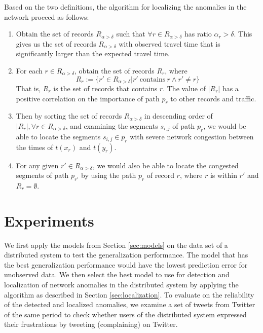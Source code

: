 \documentclass[conference]{IEEEtran.1.8}
\begin{document}
Based on the two definitions, the algorithm for localizing the anomalies in the network proceed as follows:
\begin{enumerate}
	\item Obtain the set of records $R_{\alpha > \delta}$ such that $\forall r \in R_{\alpha > \delta}$ has ratio $\alpha_r > \delta$. This gives us the set of records $R_{\alpha > \delta}$ with observed travel time that is significantly larger than the expected travel time.
	\item For each $r \in R_{\alpha > \delta}$, obtain the set of records $R_r$, where
	\[ R_{r} := \{ r' \in R_{\alpha > \delta} | r' ~ \text{contains} ~ r \land r' \neq r \} \]
	That is, $R_r$ is the set of records that contains $r$. The value of $|R_r|$ has a positive correlation on the importance of path $p_r$ to other records and traffic.
	\item Then by sorting the set of records $R_{\alpha > \delta}$ in descending order of $|R_r|, \forall r \in R_{\alpha > \delta}$, and examining the segments $s_{i,j}$ of path $p_r$, we would be able to locate the segments $s_{i,j} \in p_r$ with severe network congestion between the times of $t(x_r)$ and $t(y_r)$.
	\item For any given $r' \in R_{\alpha > \delta}$, we would also be able to locate the congested segments of path $p_{r'}$ by using the path $p_r$ of record $r$, where $r$ is within $r'$ and $R_r = \emptyset$.
\end{enumerate}

\section{Experiments}
\label{sec:experiments}

We first apply the models from Section \ref{sec:models} on the data set of a distributed system to test the generalization performance. The model that has the best generalization performance would have the lowest prediction error for unobserved data. We then select the best model to use for detection and localization of network anomalies in the distributed system by applying the algorithm as described in Section \ref{sec:localization}. To evaluate on the reliability of the detected and localized anomalies, we examine a set of tweets from Twitter of the same period to check whether users of the distributed system expressed their frustrations by tweeting (complaining) on Twitter.
\end{document}
